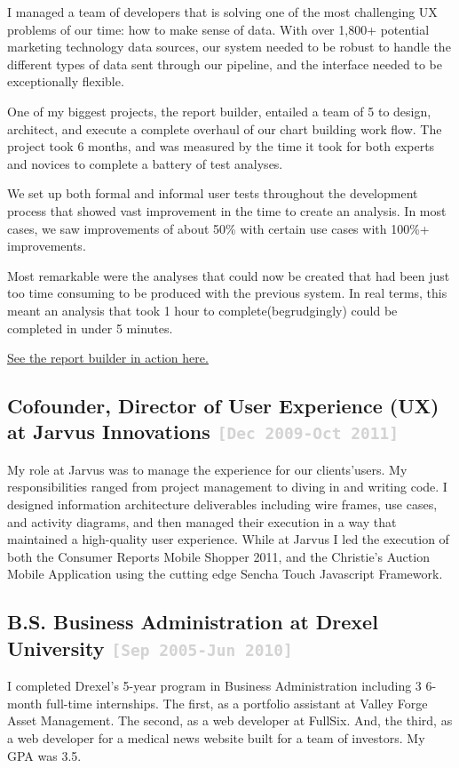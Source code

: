 \documentclass{tufte-handout}
\newcommand{\shstandout}[1]{\textbf{\textcolor{BurntOrange}{#1}}}
\newcommand{\shyears}[1]{\small{\texttt{\textcolor{LightGray}{#1}}}}
\begin{document}
I managed a team of developers that is solving one of the most challenging UX problems of our time: how to make sense of data. With over 1,800+ potential marketing technology data sources, our system needed to be robust to handle the different types of data sent through our pipeline, and the interface needed to be exceptionally flexible.

One of my biggest projects, the report builder, entailed a team of 5 to design, architect, and execute a complete overhaul of our chart building work flow. The project took 6 months, and was measured by the time it took for both experts and novices to complete a battery of test analyses.

We set up both formal and informal user tests throughout the development process that showed vast improvement in the time to create an analysis. In most cases, we saw improvements of about 50\% with certain use cases with 100\%+ improvements.

Most remarkable were the analyses that could now be created that had been just too time consuming to be produced with the previous system. In real terms, this meant an analysis that took 1 hour to complete(begrudgingly) could be completed in under 5 minutes.

\href{https://magento.com/resources/tag/product-demo\%3A-business-intelligence}{See the report builder in action here.}

\subsection{\textbf{Cofounder, Director of User Experience (UX)} at \shstandout{Jarvus Innovations} \shyears{[Dec 2009-Oct 2011]}}

My role at Jarvus was to manage the experience for our clients'​ users. My responsibilities ranged from project management to diving in and writing code. I designed information architecture deliverables including wire frames, use cases, and activity diagrams, and then managed their execution in a way that maintained a high-quality user experience.
While at Jarvus I led the execution of both the Consumer Reports Mobile Shopper 2011, and the Christie's Auction Mobile Application using the cutting edge Sencha Touch Javascript Framework.


\subsection{\textbf{B.S. Business Administration} at \shstandout{Drexel University} \shyears{[Sep 2005-Jun 2010]}}
I completed Drexel's 5-year program in Business Administration including 3 6-month full-time internships. The first, as a portfolio assistant at Valley Forge Asset Management. The second, as a web developer at FullSix. And, the third, as a web developer for a medical news website built for a team of investors. My GPA was 3.5.
\end{document}
